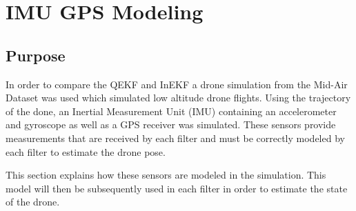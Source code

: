 \section{IMU GPS Modeling}
\subsection{Purpose}
In order to compare the QEKF and InEKF a drone simulation from the Mid-Air Dataset \cite{Fonder2019MidAir} was used which simulated low altitude drone flights. Using the trajectory of the done, an Inertial Measurement Unit (IMU) containing an accelerometer and gyroscope as well as a GPS receiver was simulated. These sensors provide measurements that are received by each filter and must be correctly modeled by each filter to estimate the drone pose.

This section explains how these sensors are modeled in the simulation. This model will then be subsequently used in each filter in order to estimate the state of the drone.


